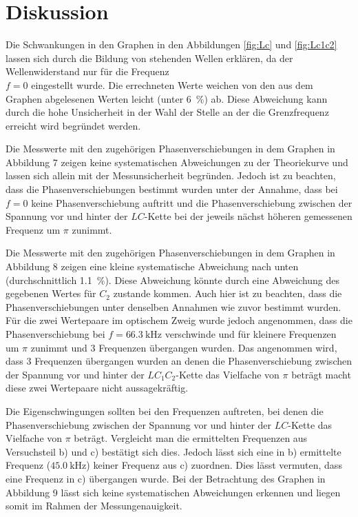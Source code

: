 
\section{Diskussion}
\label{sec:Diskussion}

Die Schwankungen in den Graphen in den Abbildungen \ref{fig:Lc} und \ref{fig:Lc1c2} lassen sich durch die Bildung von stehenden Wellen erklären, da der Wellenwiderstand nur für die Frequenz \\$f=0$ eingestellt wurde. Die errechneten Werte weichen von den aus dem Graphen abgelesenen Werten leicht (unter \SI{6}{\percent}) ab. Diese Abweichung kann durch die hohe Unsicherheit in der Wahl der Stelle an der die Grenzfrequenz erreicht wird begründet werden. 

Die Messwerte mit den zugehörigen Phasenverschiebungen in dem Graphen in Abbildung 7 zeigen keine systematischen Abweichungen zu der Theoriekurve und lassen sich allein mit der Messunsicherheit begründen. Jedoch ist zu beachten, dass die Phasenverschiebungen bestimmt wurden unter der Annahme, dass bei $f=0$ keine Phasenverschiebung auftritt und die Phasenverschiebung zwischen der Spannung vor und hinter der $LC$-Kette bei der jeweils nächst höheren gemessenen Frequenz um $\pi$ zunimmt.

Die Messwerte mit den zugehörigen Phasenverschiebungen in dem Graphen in Abbildung 8 zeigen eine kleine systematische Abweichung nach unten (durchschnittlich \SI{1.1}{\percent}). Diese Abweichung könnte durch eine Abweichung des gegebenen Wertes für $C_2$ zustande kommen. Auch hier ist zu beachten, dass die Phasenverschiebungen unter denselben Annahmen wie zuvor bestimmt wurden. Für die zwei Wertepaare im optischem Zweig wurde jedoch angenommen, dass die Phasenverschiebung bei $f=\SI{66.3}{\kilo\hertz}$ verschwinde und für kleinere Frequenzen um $\pi$ zunimmt und 3 Frequenzen übergangen wurden. Das angenommen wird, dass 3 Frequenzen übergangen wurden an denen die Phasenverschiebung zwischen der Spannung vor und hinter der $LC_1C_2$-Kette das Vielfache von $\pi$ beträgt macht diese zwei Wertepaare nicht aussagekräftig.

Die Eigenschwingungen sollten bei den Frequenzen auftreten, bei denen die Phasenverschiebung zwischen der Spannung vor und hinter der $LC$-Kette das Vielfache von $\pi$ beträgt. Vergleicht man die ermittelten Frequenzen aus Versuchsteil b) und c) bestätigt sich dies. Jedoch lässt sich eine in b) ermittelte Frequenz ($\SI{45.0}{\kilo\hertz}$) keiner Frequenz aus c) zuordnen. Dies lässt vermuten, dass eine Frequenz in c) übergangen wurde.
Bei der Betrachtung des Graphen in Abbildung 9 lässt sich keine systematischen Abweichungen erkennen und liegen somit im Rahmen der Messungenauigkeit.


